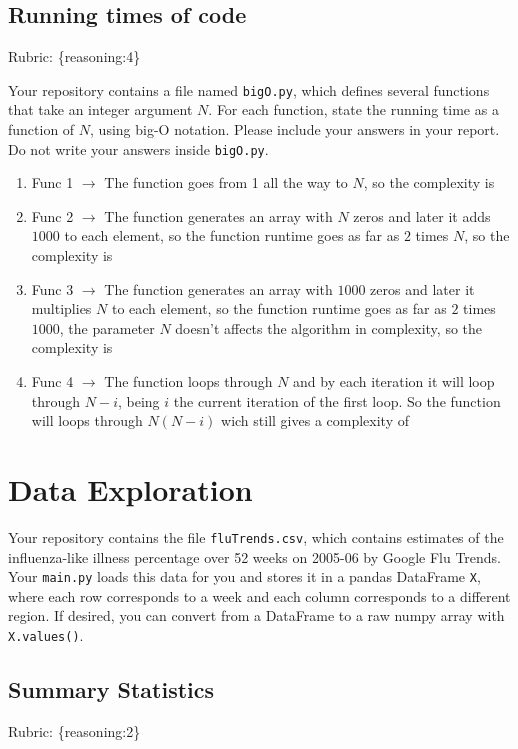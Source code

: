 \documentclass{article}
\def\rubric#1{\gre{Rubric: \{#1\}}}{}
\def\blu#1{{\color{blu}#1}}
\def\gre#1{{\color{gre}#1}}
\def\ans#1{{\color{ans}#1}}
\begin{document}
\subsection{Running times of code}
\rubric{reasoning:4}

Your repository contains a file named \texttt{bigO.py}, which defines several functions
that take an integer argument $N$. For each function, \blu{state the running time as a function of $N$, using big-O notation}.
Please include your answers in your report. Do not write your answers inside \texttt{bigO.py}.

\begin{enumerate}
\item Func 1 $\rightarrow$ \ans{The function goes from 1 all the way to $N$, so the complexity is }
\item Func 2 $\rightarrow$ \ans{The function generates an array with $N$ zeros and later it adds $1000$ to each element, so the function runtime goes as far as $2$ times $N$, so the complexity is \fbox{O($N$)}}
\item Func 3 $\rightarrow$ \ans{The function generates an array with $1000$ zeros and later it multiplies $N$ to each element, so the function runtime goes as far as $2$ times $1000$, the parameter $N$ doesn't affects the algorithm in complexity, so the complexity is \fbox{O($1$)}}
\item Func 4 $\rightarrow$ \ans{The function loops through $N$ and by each iteration it will loop through $N - i$, being $i$ the current iteration of the first loop. So the function will loops through $N(N-i)$ wich still gives a complexity of \fbox{O($N^2$)}}
\end{enumerate}

\section{Data Exploration}


Your repository contains the file \texttt{fluTrends.csv}, which contains estimates
of the influenza-like illness percentage over 52 weeks on 2005-06 by Google Flu Trends.
Your \texttt{main.py} loads this data for you and stores it in a pandas DataFrame \texttt{X},
where each row corresponds to a week and each column
corresponds to a different
region. If desired, you can convert from a DataFrame to a raw numpy array with \texttt{X.values()}.

\subsection{Summary Statistics}
\rubric{reasoning:2}
\end{document}
